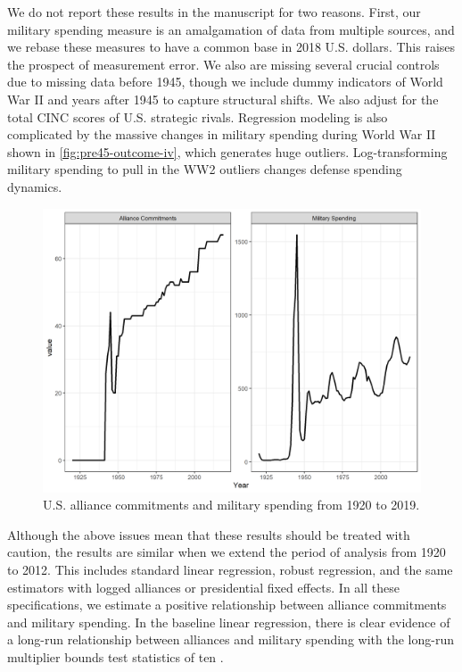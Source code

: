 \documentclass[12pt]{article}
\begin{document}
We do not report these results in the manuscript for two reasons.
First, our military spending measure is an amalgamation of data from multiple sources, and we rebase these measures to have a common base in 2018 U.S. dollars. 
This raises the prospect of measurement error. 
We also are missing several crucial controls due to missing data before 1945, though we include dummy indicators of World War II and years after 1945 to capture structural shifts.
We also adjust for the total CINC scores of U.S. strategic rivals. 
Regression modeling is also complicated by the massive changes in military spending during World War II shown in \autoref{fig:pre45-outcome-iv}, which generates huge outliers. 
Log-transforming military spending to pull in the WW2 outliers changes defense spending dynamics.  



\begin{figure} 
\includegraphics[width = .95\textwidth]{pre45-outcome-iv.png}
\caption{U.S. alliance commitments and military spending from 1920 to 2019.}
\label{fig:pre45-outcome-iv}
\end{figure}


Although the above issues mean that these results should be treated with caution, the results are similar when we extend the period of analysis from 1920 to 2012. 
This includes standard linear regression, robust regression, and the same estimators with logged alliances or presidential fixed effects.
In all these specifications, we estimate a positive relationship between alliance commitments and military spending. 
In the baseline linear regression, there is clear evidence of a long-run relationship between alliances and military spending with the long-run multiplier bounds test statistics of ten \citet{Webbetal2019}. 
\end{document}
